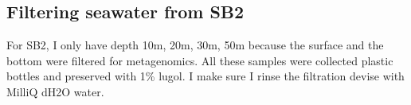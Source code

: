 \subsection{Filtering seawater from SB2}
\label{task:20180307_cj1}

For SB2, I only have depth 10m, 20m, 30m, 50m because the surface and the bottom were filtered for metagenomics. All these samples were collected plastic bottles and preserved with 1\% lugol. I make sure I rinse the filtration devise with MilliQ dH2O water. 